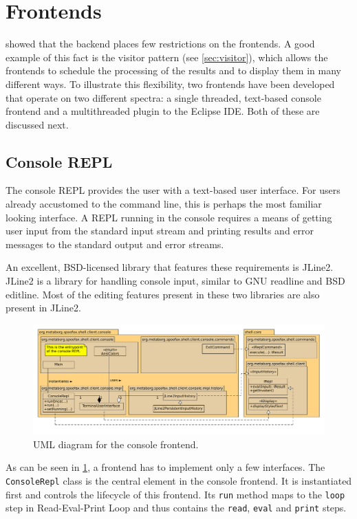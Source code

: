\section{Frontends}
\label{sec:frontends}

 showed that the backend places few restrictions on the
frontends. A good example of this fact is the visitor pattern (see
\cref{sec:visitor}), which allows the frontends to schedule the processing of
the results and to display them in many different ways.  To illustrate this
flexibility, two frontends have been developed that operate on two different
spectra: a single threaded, text-based console frontend and a multithreaded
plugin to the Eclipse IDE. Both of these are discussed next.

\subsection{Console REPL}
\label{ssec:consolerepl}

The console REPL provides the user with a text-based user interface. For users
already accustomed to the command line, this is perhaps the most familiar
looking interface. A REPL running in the console requires a means of getting
user input from the standard input stream and printing results and error
messages to the standard output and error streams.

An excellent, BSD-licensed library that features these requirements is JLine2.
JLine2 is a library for handling console input, similar to GNU readline and BSD
editline. Most of the editing features present in these two libraries are also
present in JLine2.

\begin{figure}[h]
  \includegraphics[width=\textwidth]{uml-console}
  \caption{UML diagram for the console frontend.}
  \label{fig:uml-console}
\end{figure}

As can be seen in \cref{fig:uml-console}, a frontend has to implement only a few
interfaces. The \texttt{ConsoleRepl} class is the central element in the
console frontend. It is instantiated first and controls the lifecycle of this
frontend. Its \texttt{run} method maps to the \texttt{loop} step in
Read-Eval-Print Loop and thus contains the \texttt{read}, \texttt{eval} and
\texttt{print} steps.

